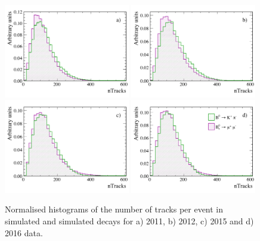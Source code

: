\begin{figure}[tbp]
  \centering
    \includegraphics[width=0.49\textwidth]{./Figs/LifetimeMeasurement/nTracks_2011_Bs2MuMu_Bd2KPi.pdf}
    \includegraphics[width=0.49\textwidth]{./Figs/LifetimeMeasurement/nTracks_2012_Bs2MuMu_Bd2KPi.pdf}
    \includegraphics[width=0.49\textwidth]{./Figs/LifetimeMeasurement/nTracks_2015_Bs2MuMu_Bd2KPi.pdf}
    \includegraphics[width=0.49\textwidth]{./Figs/LifetimeMeasurement/nTracks_2016_Bs2MuMu_Bd2KPi.pdf}
  \caption{Normalised histograms of the number of tracks per event in simulated \bdkpi and simulated \bsmumu decays for a) 2011, b) 2012, c) 2015 and d) 2016 data.}%
  \label{fig:BsmmVsBdToKpinTracks}
\end{figure}

